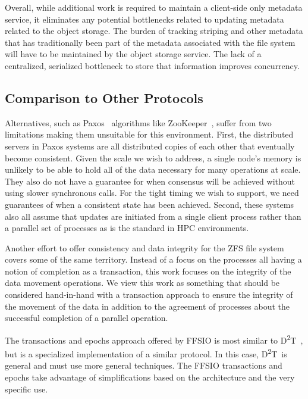 \documentclass[conference]{IEEEtran}
\newcommand{\DDT}{D\textsuperscript{2}T~}
\begin{document}
Overall, while additional work is required to maintain a client-side only
metadata service, it eliminates any potential bottlenecks related to updating
metadata related to the object storage. The burden of tracking striping and
other metadata that has traditionally been part of the metadata associated with
the file system will have to be maintained by the object storage service. The
lack of a centralized, serialized bottleneck to store that information improves
concurrency.

\subsection{Comparison to Other Protocols}
Alternatives, such as Paxos~\cite{Lamport:1998:paxos} algorithms like
ZooKeeper~\cite{Hunt:2010:zookeeper}, suffer from two limitations making them
unsuitable for this environment. First, the distributed servers in Paxos
systems are all distributed copies of each other that eventually become
consistent. Given the scale we wish to address, a single node's memory is
unlikely to be able to hold all of the data necessary for many operations at
scale. They also do not have a guarantee for when consensus will be achieved
without using slower synchronous calls. For the tight timing we wish to
support, we need guarantees of when a consistent state has been achieved.
Second, these systems also all assume that updates are initiated from a single
client process rather than a parallel set of processes as is the standard in
HPC environments.

Another effort to offer consistency and data integrity for the ZFS file
system~\cite{zhang:2010:zfs} covers some of the same territory. Instead of a
focus on the processes all having a notion of completion as a transaction, this
work focuses on the integrity of the data movement operations. We view this
work as something that should be considered hand-in-hand with a transaction
approach to ensure the integrity of the movement of the data in addition to the
agreement of processes about the successful completion of a parallel operation.

The transactions and epochs approach offered by FFSIO is most similar to
\DDT, but is a specialized implementation of a similar protocol. In this case,
\DDT is general and must use more general techniques. The FFSIO transactions
and epochs take advantage of simplifications based on the architecture and the
very specific use.
\end{document}
